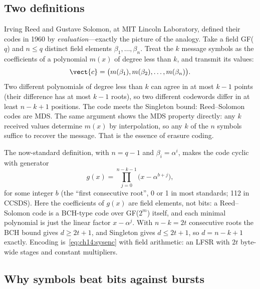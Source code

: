 \subsection{Two definitions}

Irving Reed and Gustave Solomon, at MIT Lincoln Laboratory, defined their codes in 1960 by
\emph{evaluation}---exactly the picture of the analogy. Take a field GF($q$) and $n\le q$ distinct field
elements $\beta_1,\dots,\beta_n$. Treat the $k$ message symbols as the coefficients of a polynomial
$m(x)$ of degree less than $k$, and transmit its values:
\begin{equation}
\vect{c}=\big(m(\beta_1),m(\beta_2),\dots,m(\beta_n)\big).
\label{eq:ch14:rseval}
\end{equation}
Two different polynomials of degree less than $k$ can agree in at most $k-1$ points (their
difference has at most $k-1$ roots), so two different codewords differ in at least $n-k+1$
positions. The code meets the Singleton bound: Reed--Solomon codes are MDS. The same argument
shows the MDS property directly: any $k$ received values determine $m(x)$ by interpolation, so any
$k$ of the $n$ symbols suffice to recover the message. That is the essence of erasure coding.


The now-standard definition, with $n=q-1$ and $\beta_i=\alpha^{i}$, makes the code cyclic with
generator
\begin{equation}
g(x)=\prod_{j=0}^{n-k-1}\big(x-\alpha^{b+j}\big),
\label{eq:ch14:rsgen}
\end{equation}
for some integer $b$ (the ``first consecutive root'', 0 or 1 in most standards; 112 in CCSDS).
Here the coefficients of $g(x)$ are field elements, not bits: a Reed--Solomon code is a BCH-type
code over GF($2^m$) itself, and each minimal polynomial is just the linear factor $x-\alpha^j$. With
$n-k=2t$ consecutive roots the BCH bound gives $d\ge2t+1$, and Singleton gives $d\le2t+1$, so
$d=n-k+1$ exactly. Encoding is~\eqref{eq:ch14:sysenc} with field arithmetic: an LFSR with $2t$
byte-wide stages and constant multipliers.

\subsection{Why symbols beat bits against bursts}

